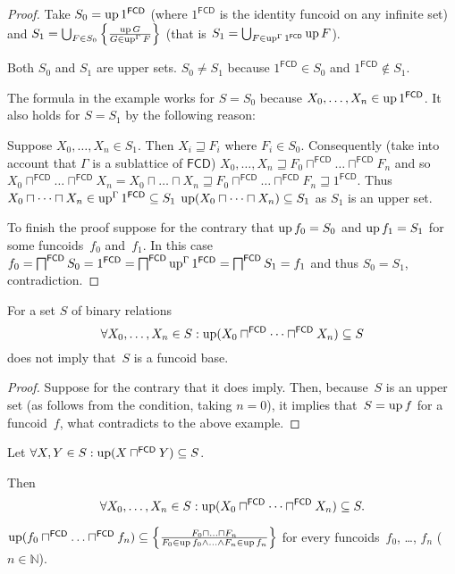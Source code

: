 \begin{proof}
Take $S_0 = \operatorname{up} 1^{\mathsf{FCD}}$ (where $1^{\mathsf{FCD}}$ is the identity funcoid on any infinite set)
and $S_1 = \bigcup_{F\in S_0} \left\{ \frac{\operatorname{up} G}{G\in\operatorname{up}^{\Gamma} F}\right\}$ (that is
$S_1 = \bigcup_{F\in\operatorname{up}^{\Gamma} 1^{\mathsf{FCD}}}\operatorname{up} F$).

Both $S_0$ and $S_1$ are upper sets. $S_0\ne S_1$ because $1^{\mathsf{FCD}}\in S_0$ and $1^{\mathsf{FCD}}\notin S_1$.

The formula in the example works for $S=S_0$ because $X_0,\dots,X_n\in \operatorname{up} 1^{\mathsf{FCD}}$. It also holds for $S=S_1$ by the
following reason:

Suppose $X_0,\dots,X_n\in S_1$. Then $X_i\sqsupseteq F_i$ where $F_i\in S_0$.
Consequently (take into account that $\Gamma$ is a sublattice of $\mathsf{FCD}$)
$X_0,\dots,X_n \sqsupseteq F_0\sqcap^{\mathsf{FCD}}\dots\sqcap^{\mathsf{FCD}} F_n$ and so
$X_0\sqcap^{\mathsf{FCD}}\dots\sqcap^{\mathsf{FCD}} X_n=
X_0\sqcap\dots\sqcap X_n \sqsupseteq F_0\sqcap^{\mathsf{FCD}}\dots\sqcap^{\mathsf{FCD}} F_n \sqsupseteq 1^{\mathsf{FCD}}$.
Thus $X_0\sqcap\dots\sqcap X_n \in \operatorname{up}^{\Gamma} 1^{\mathsf{FCD}} \subseteq S_1$
$\operatorname{up}(X_0\sqcap\dots\sqcap X_n)\subseteq S_1$ as $S_1$ is an upper set.

To finish the proof suppose for the contrary that $\operatorname{up} f_0=S_0$ and $\operatorname{up} f_1=S_1$ for some funcoids~$f_0$ and~$f_1$.
In this case $f_0=\bigsqcap^{\mathsf{FCD}} S_0 = 1^{\mathsf{FCD}} = \bigsqcap^{\mathsf{FCD}} \operatorname{up}^{\Gamma} 1^{\mathsf{FCD}} =
\bigsqcap^{\mathsf{FCD}} S_1 = f_1$ and thus $S_0=S_1$, contradiction.
\end{proof}

\begin{prop}
For a set $S$ of binary relations
\[ \forall X_0,\dots,X_n\in S:\operatorname{up}(X_0\sqcap^{\mathsf{FCD}}\dots\sqcap^{\mathsf{FCD}} X_n)\subseteq S \]
does not imply that~$S$ is a funcoid base.
\end{prop}

\begin{proof}
Suppose for the contrary that it does imply. Then, because~$S$ is an upper set (as follows from the condition,
taking $n=0$), it implies that~$S=\operatorname{up} f$ for a funcoid~$f$, what contradicts to the above example.
\end{proof}

\begin{conjecture}
  Let $\forall X,Y\in S:\operatorname{up}(X\sqcap^{\mathsf{FCD}} Y)\subseteq S$.
  
  Then
  \[ \forall X_0,\dots,X_n\in S:\operatorname{up}(X_0\sqcap^{\mathsf{FCD}}\dots\sqcap^{\mathsf{FCD}} X_n)\subseteq S. \]
\end{conjecture}

\begin{xca}
$\operatorname{up} (f_0 \sqcap^{\mathsf{FCD}} \ldots
\sqcap^{\mathsf{FCD}} f_n) \subseteq \left\{ \frac{ F_0 \sqcap \ldots \sqcap
F_n }{ F_0 \in \operatorname{up} f_0 \wedge \ldots \wedge F_n \in \operatorname{up} f_n }\right\}$ for every funcoids~$f_0$, \dots, $f_n$ ($n\in\mathbb{N}$).
\end{xca}
